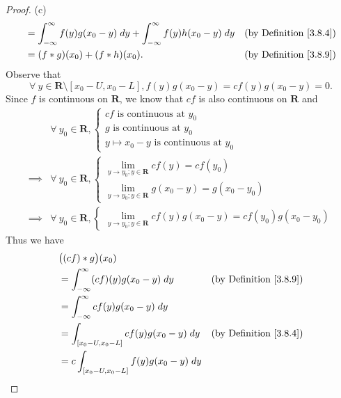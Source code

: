 \begin{proof}{(c)}
\begin{align*}
         & = \int_{-\infty}^\infty f(y) g(x_0 - y) \; dy + \int_{-\infty}^\infty f(y) h(x_0 - y) \; dy              & \text{(by Definition \ref{3.8.4})} \\
         & = (f * g)(x_0) + (f * h)(x_0).                                                                           & \text{(by Definition \ref{3.8.9})}
    \end{align*}
    Observe that
    \[
        \forall\ y \in \mathbf{R} \setminus [x_0 - U, x_0 - L], f(y) g(x_0 - y) = c f(y) g(x_0 - y) = 0.
    \]
    Since \(f\) is continuous on \(\mathbf{R}\), we know that \(cf\) is also continuous on \(\mathbf{R}\) and
    \begin{align*}
                 & \forall\ y_0 \in \mathbf{R}, \begin{cases}
            cf \text{ is continuous at } y_0 \\
            g \text{ is continuous at } y_0  \\
            y \mapsto x_0 - y \text{ is continuous at } y_0
        \end{cases} \\
        \implies & \forall\ y_0 \in \mathbf{R}, \begin{cases}
            \lim_{y \to y_0 ; y \in \mathbf{R}} cf(y) = cf(y_0) \\
            \lim_{y \to y_0 ; y \in \mathbf{R}} g(x_0 - y) = g(x_0 - y_0)
        \end{cases} \\
        \implies & \forall\ y_0 \in \mathbf{R}, \begin{cases}
            \lim_{y \to y_0 ; y \in \mathbf{R}} cf(y) g(x_0 - y) = cf(y_0) g(x_0 - y_0)
        \end{cases}
    \end{align*}
    Thus we have
    \begin{align*}
         & \big((cf) * g\big)(x_0)                                                                  \\
         & = \int_{-\infty}^\infty (cf)(y) g(x_0 - y) \; dy    & \text{(by Definition \ref{3.8.9})} \\
         & = \int_{-\infty}^\infty c f(y) g(x_0 - y) \; dy                                          \\
         & = \int_{[x_0 - U, x_0 - L]} c f(y) g(x_0 - y) \; dy & \text{(by Definition \ref{3.8.4})} \\
         & = c \int_{[x_0 - U, x_0 - L]} f(y) g(x_0 - y) \; dy                                      \\

\end{align*}
\end{proof}
